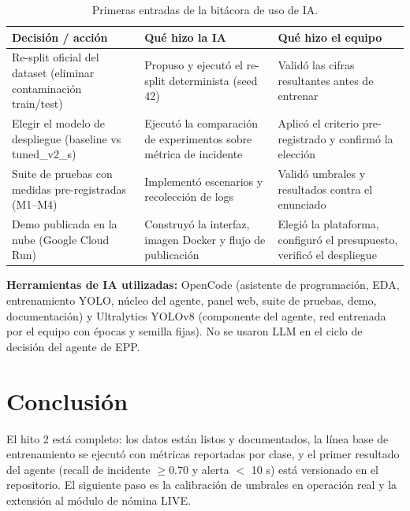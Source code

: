 \documentclass[conference,spanish]{IEEEtran}
\begin{document}
\begin{table}[h]
\centering
\caption{Primeras entradas de la bitácora de uso de IA.}
\label{tab:bitacora}
\begin{tabular}{p{} p{} p{}}
\toprule
\textbf{Decisión / acción} & \textbf{Qué hizo la IA} & \textbf{Qué hizo el equipo} \\
\midrule
Re-split oficial del dataset (eliminar contaminación train/test) & Propuso y ejecutó el re-split determinista (seed 42) & Validó las cifras resultantes antes de entrenar \\
Elegir el modelo de despliegue (baseline vs tuned\_v2\_s) & Ejecutó la comparación de experimentos sobre métrica de incidente & Aplicó el criterio pre-registrado y confirmó la elección \\
Suite de pruebas con medidas pre-registradas (M1--M4) & Implementó escenarios y recolección de logs & Validó umbrales y resultados contra el enunciado \\
Demo publicada en la nube (Google Cloud Run) & Construyó la interfaz, imagen Docker y flujo de publicación & Elegió la plataforma, configuró el presupuesto, verificó el despliegue \\
\bottomrule
\end{tabular}
\end{table}

\textbf{Herramientas de IA utilizadas:} OpenCode (asistente de programación, EDA, entrenamiento YOLO, núcleo del agente, panel web, suite de pruebas, demo, documentación) y Ultralytics YOLOv8 (componente del agente, red entrenada por el equipo con épocas y semilla fijas). No se usaron LLM en el ciclo de decisión del agente de EPP.

\section{Conclusión}
El hito 2 está completo: los datos están listos y documentados, la línea base de entrenamiento se ejecutó con métricas reportadas por clase, y el primer resultado del agente (recall de incidente $\geq 0.70$ y alerta $<$ 10 s) está versionado en el repositorio. El siguiente paso es la calibración de umbrales en operación real y la extensión al módulo de nómina LIVE.
\end{document}

